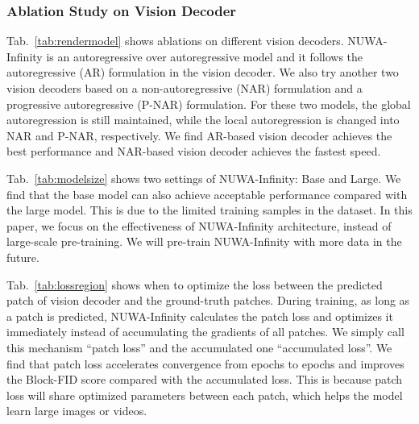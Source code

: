\documentclass{article}
\begin{document}
\subsubsection{Ablation Study on Vision Decoder}\label{sec:ablvd}
Tab.~\ref{tab:rendermodel} shows ablations on different vision decoders. NUWA-Infinity is an autoregressive over autoregressive model and it follows the autoregressive (AR) formulation in the vision decoder. We also try another two vision decoders based on a non-autoregressive (NAR) formulation and a progressive autoregressive (P-NAR) formulation. For these two models, the global autoregression is still maintained, while the local autoregression is changed into NAR and P-NAR, respectively. We find AR-based vision decoder achieves the best performance and NAR-based vision decoder achieves the fastest speed.

Tab.~\ref{tab:modelsize} shows two settings of NUWA-Infinity: Base and Large. We find that the base model can also achieve acceptable performance compared with the large model. This is due to the limited training samples in the dataset. In this paper, we focus on the effectiveness of NUWA-Infinity architecture, instead of large-scale pre-training. We will pre-train NUWA-Infinity with more data in the future.


Tab.~\ref{tab:lossregion} shows when to optimize the loss between the predicted patch of vision decoder and the ground-truth patches. During training, as long as a patch is predicted, NUWA-Infinity calculates the patch loss and optimizes it immediately instead of accumulating the gradients of all patches. We simply call this mechanism ``patch loss'' and the accumulated one ``accumulated loss''. We find that patch loss accelerates convergence from  epochs to  epochs and improves the Block-FID score compared with the accumulated loss. This is because patch loss will share optimized parameters between each patch, which helps the model learn large images or videos.
\end{document}
